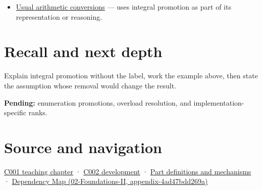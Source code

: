\begin{itemize}
\tightlist
\item
  \hyperref[appendix-5e2d663adf7f]{Usual arithmetic conversions} --- uses integral promotion as part of its representation or reasoning.
\end{itemize}

\section{Recall and next depth}\label{appendix-45303d03796a-recall-and-next-depth}

Explain integral promotion without the label, work the example above, then state the assumption whose removal would change the result.

\textbf{Pending:} enumeration promotions, overload resolution, and implementation-specific ranks.

\section{Source and navigation}\label{appendix-45303d03796a-source-and-navigation}

\href{Continuous\%20Notes/Computing\%20Foundations\%20-\%20From\%20Bits\%20to\%20C++\%20and\%20Systems\%20APIs\#From\%20a\%20signal\%20to\%20an\%20interpretation}{C001 teaching chapter} · \href{Continuous\%20Notes/Computing\%20Foundations\%20-\%20From\%20Bits\%20to\%20C++\%20and\%20Systems\%20APIs\#Arithmetic\%20becomes\%20a\%20policy}{C002 development} · \hyperref[appendix-fd090d982a15]{Part definitions and mechanisms} · \href{../02-Foundations-II/main.pdf\#nameddest=appendix-4ad47bdd269a}{Dependency Map (02-Foundations-II, appendix-4ad47bdd269a)}
